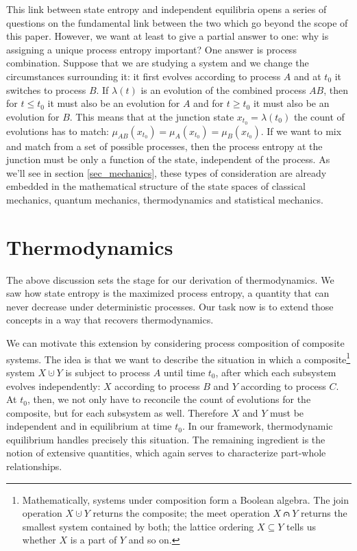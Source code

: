 \documentclass[letterpaper,twocolumn]{article}
\begin{document}
This link between state entropy and independent equilibria opens a series of questions on the fundamental link between the two which go beyond the scope of this paper. However, we want at least to give a partial answer to one: why is assigning a unique process entropy important? One answer is process combination. Suppose that we are studying a system and we change the circumstances surrounding it: it first evolves according to process $A$ and at $t_0$ it switches to process $B$. If $\lambda(t)$ is an evolution of the combined process $AB$, then for $t \leq t_0$ it must also be an evolution for $A$ and for $t \geq t_0$ it must also be an evolution for $B$. This means that at the junction state $x_{t_0} = \lambda(t_0)$ the count of evolutions has to match: $\mu_{AB}(x_{t_0})=\mu_A(x_{t_0})=\mu_B(x_{t_0})$. If we want to mix and match from a set of possible processes, then the process entropy at the junction must be only a function of the state, independent of the process. As we'll see in section \ref{sec_mechanics}, these types of consideration are already embedded in the mathematical structure of the state spaces of classical mechanics, quantum mechanics, thermodynamics and statistical mechanics.

\section{Thermodynamics}\label{sec_thermodynamics}

The above discussion sets the stage for our derivation of thermodynamics. We saw how state entropy is the maximized process entropy, a quantity that can never decrease under deterministic processes. Our task now is to extend those concepts in a way that recovers thermodynamics.

We can motivate this extension by considering process composition of composite systems. The idea is that we want to describe the situation in which a composite\footnote{Mathematically, systems under composition form a Boolean algebra. The join operation $X \cupdot Y$ returns the composite; the meet operation $X \capdot Y$ returns the smallest system contained by both; the lattice ordering $X \subseteq Y$ tells us whether $X$ is a part of $Y$ and so on.} system $X \cupdot Y$ is subject to process $A$ until time $t_0$, after which each subsystem evolves independently: $X$ according to process $B$ and $Y$ according to process $C$. At $t_0$, then, we not only have to reconcile the count of evolutions for the composite, but for each subsystem as well. Therefore $X$ and $Y$ must be independent and in equilibrium at time $t_0$. In our framework, thermodynamic equilibrium handles precisely this situation. The remaining ingredient is the notion of extensive quantities, which again serves to characterize part-whole relationships.
\end{document}
